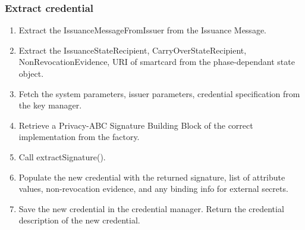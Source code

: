  \subsubsection{Extract credential}
  \begin{enumerate}
    \item Extract the IssuanceMessageFromIssuer from the Issuance Message.
    \item Extract the IssuanceStateRecipient, CarryOverStateRecipient, NonRevocationEvidence, URI of smartcard from the phase-dependant state object.
    \item Fetch the system parameters, issuer parameters, credential specification from the key manager.
    \item Retrieve a Privacy-ABC Signature Building Block of the correct implementation from the factory.
    \item Call extractSignature().
    \item Populate the new credential with the returned signature, list of attribute values, non-revocation evidence, and any binding info for external secrets.
    \item Save the new credential in the credential manager. Return the credential description of the new credential.
  \end{enumerate}

